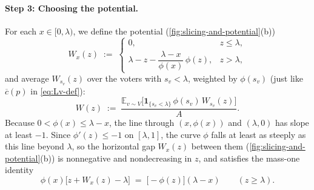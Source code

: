 \documentclass[11pt]{article}
\numberwithin{equation}{section}
\theoremstyle{plain}
\theoremstyle{definition}
\newcommand{\E}{\mathbb{E}}
\newcommand{\1}{\mathbf{1}}
\begin{document}
\paragraph{Step 3: Choosing the potential.}
For each $x \in [0, \lambda)$, we define the potential (\cref{fig:slicing-and-potential}(b))
\begin{equation}
  W_x(z) \;:=\;
  \begin{cases}
    0, & z \le \lambda, \\
    \lambda - z - \dfrac{\lambda - x}{\phi(x)}\,\phi(z), & z > \lambda,
  \end{cases}
  \label{eq:potential-def}
\end{equation}
and average $W_{s_v}(z)$ over the voters with $s_v < \lambda$, weighted by $\phi(s_v)$ (just like $\overline{c}(p)$ in \cref{eq:Lv-def}):
\begin{equation}
  W(z) \;:=\; \frac{\E_{v \sim V}\bigl[\1_{\{s_v < \lambda\}}\,\phi(s_v)\,W_{s_v}(z)\bigr]}{A}.
  \label{eq:W-avg-def}
\end{equation}
Because $0 < \phi(x) \le \lambda - x$, the line through $(x, \phi(x))$ and $(\lambda, 0)$ has slope at least $-1$. Since $\phi'(z) \le -1$ on $[\lambda, 1]$, the curve $\phi$ falls at least as steeply as this line beyond $\lambda$, so the horizontal gap $W_x(z)$ between them (\cref{fig:slicing-and-potential}(b)) is nonnegative and nondecreasing in $z$, and satisfies the mass-one identity
\[
  \phi(x)\bigl[z + W_x(z) - \lambda\bigr] \;=\; \bigl[-\phi(z)\bigr](\lambda - x)
  \qquad (z \ge \lambda).
\]
\end{document}
